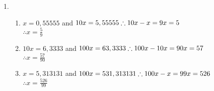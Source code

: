 \begin{solutions}{}
{\begin{enumerate}[itemsep=5pt, label=\textbf{\arabic*}. ]
\begin{enumerate}[itemsep=5pt, label=\textbf{(\alph*)} ]
\item \begin{array*} $1\frac{3}{11} &= 1 + 3(\frac{1}{11} \\
        &= 1 + 3(0,090909\ldots)\\
&= 1 + 0,27272727\ldots \\
&= 1,\overline{27}$
       \end{array*}

\item \begin{array*} $
        4\frac{5}{6} &= 4 + 5(\frac{1}{6}) \\
&= 4+ 5(0,1666666\ldots) \\
&= 4 + 0,833333\ldots \\& = 4,8\dot{3}$
       \end{array*}

\item \begin{array*}$
        2\frac{1}{9} &= 2 + 0,1111111\ldots \\
&= 2,\dot{1}$
       \end{array*}

\end{enumerate}

\item %
\begin{enumerate}[itemsep=5pt, label=\textbf{(\alph*)} ] 
 \item \begin{array*}$        
x=0,55555$ and $10x = 5,55555 \\
\therefore 10x-x = 9x= 5$\\
 $\therefore x=\frac{5}{9}$
\end{array*}

\item  \begin{array*} $10x = 6,3333$ and $100x= 63,3333 \\
        \therefore 100x-10x = 90x = 57$\\
 $\therefore x=\frac{57}{90}$
       \end{array*}

\item \begin{array*}
       $x = 5,313131$ and $100x=531,313131\\
 \therefore 100x-x=99x=526$ \\
$\therefore x=\frac{526}{99}$
      \end{array*}

\end{enumerate}
\end{enumerate}
}
\end{solutions}

